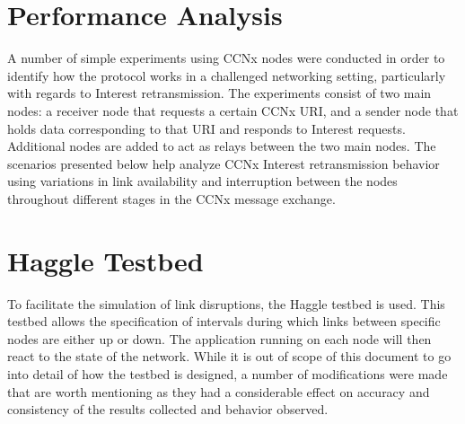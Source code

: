 \documentclass[a4paper,12pt]{report}      %
\begin{document}
\section{Performance Analysis}

A number of simple experiments using CCNx nodes were conducted in order to identify how the
protocol works in a challenged networking setting, particularly with regards to Interest retransmission.
The experiments consist of two main nodes: a receiver node that requests a certain CCNx URI, and a
sender node that holds data corresponding to that URI and responds to Interest requests. Additional
nodes are added to act as relays between the two main nodes. The scenarios presented below help
analyze CCNx Interest retransmission behavior using variations in link availability and interruption
between the nodes throughout different stages in the CCNx message exchange.

\section{Haggle Testbed}

To facilitate the simulation of link disruptions, the Haggle testbed \cite{haggle} is used. 
This testbed allows the specification of intervals during
which links between specific nodes are either up or down. The application running on each node will
then react to the state of the network. While it is out of scope of this document to go into detail of how
the testbed is designed, a number of modifications were made that are worth mentioning as they had a
considerable effect on accuracy and consistency of the results collected and behavior observed.
\end{document}
